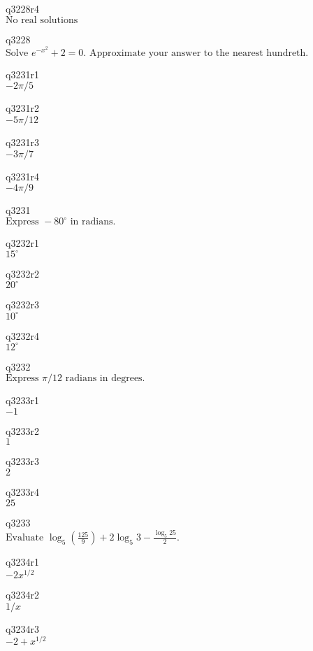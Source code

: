 q3228r4\\
\(\displaystyle \text{No real solutions} \)

q3228\\
\(\displaystyle \text{Solve } e^{-x^2} + 2 = 0. \text{ Approximate your answer to the nearest hundreth.} \)

q3231r1\\
\(\displaystyle -2\pi/5 \)

q3231r2\\
\(\displaystyle -5\pi/12 \)

q3231r3\\
\(\displaystyle -3\pi/7 \)

q3231r4\\
\(\displaystyle -4\pi/9 \)

q3231\\
\(\displaystyle \text{Express } -80^{\circ} \text{ in radians.} \)

q3232r1\\
\(\displaystyle 15^{\circ} \)

q3232r2\\
\(\displaystyle 20^{\circ} \)

q3232r3\\
\(\displaystyle 10^{\circ} \)

q3232r4\\
\(\displaystyle 12^{\circ} \)

q3232\\
\(\displaystyle \text{Express } \pi/12 \text{ radians in degrees.} \)

q3233r1\\
\(\displaystyle -1 \)

q3233r2\\
\(\displaystyle 1 \)

q3233r3\\
\(\displaystyle 2 \)

q3233r4\\
\(\displaystyle 25 \)

q3233\\
\(\displaystyle \text{Evaluate } \log_5 \left ( \frac{125}{9} \right ) + 2\log_5 3 - \frac{\log_5 25}{2}. \)

q3234r1\\
\(\displaystyle -2x^{1/2} \)

q3234r2\\
\(\displaystyle 1/x \)

q3234r3\\
\(\displaystyle -2 + x^{1/2} \)

